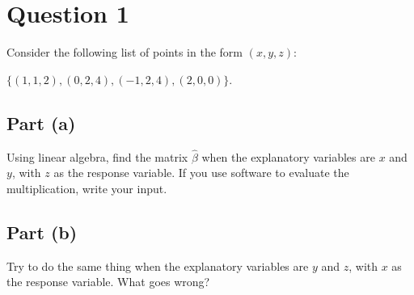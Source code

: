 \section{Question 1}

\begin{question}
    Consider the following list of points in the form $(x,y,z)$:
    \begin{center}
        $\{(1,1,2), (0,2,4), (−1,2,4), (2,0,0)\}$.
    \end{center}
\end{question}

\subsection{Part (a)}
\begin{question}
    Using linear algebra, find the matrix $\hat{\beta}$ when the explanatory variables are $x$ and $y$, with $z$ as the response variable. If you use software to evaluate the multiplication, write your input.
\end{question}

\begin{answer}

\end{answer}

\subsection{Part (b)}
\begin{question}
    Try to do the same thing when the explanatory variables are $y$ and $z$, with $x$ as the response variable. What goes wrong?
\end{question}

\begin{answer}

\end{answer}